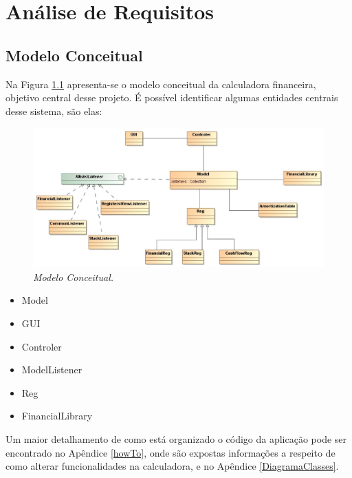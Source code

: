 \chapter{Análise de Requisitos}

\section{Modelo Conceitual}


Na Figura \ref{tab:modeConc} apresenta-se o modelo conceitual da calculadora financeira, objetivo central desse projeto. É possível identificar algumas entidades centrais desse sistema, são elas:

\begin{figure}[!h]
 \includegraphics[scale=0.5]{CalcDC.eps}
 \caption{\it Modelo Conceitual.} \label{tab:modeConc}
\end{figure}

\begin{itemize}
	\item Model
	\item GUI
	\item Controler
	\item ModelListener
	\item Reg
	\item FinancialLibrary
\end{itemize}

Um maior detalhamento de como está organizado o código da aplicação pode ser encontrado no Apêndice \ref{howTo}, onde são expostas informações a respeito de como alterar funcionalidades na calculadora, e no Apêndice \ref{DiagramaClasses}.

